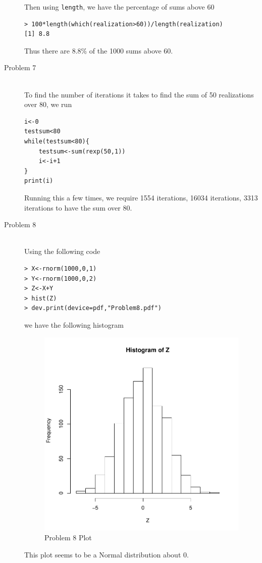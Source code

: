 \documentclass[10pt]{article}
\begin{document}
\begin{description}
Then using \verb+length+, we have the percentage of sums above 60
\begin{lstlisting}[frame=trBL]
> 100*length(which(realization>60))/length(realization)
[1] 8.8
\end{lstlisting}
Thus there are 8.8\% of the 1000 sums above 60.
\item[Problem 7]\hfill\\
To find the number of iterations it takes to find the sum of 50 realizations over 80, we run
\begin{lstlisting}[frame=trBL]
i<-0
testsum<80
while(testsum<80){
	testsum<-sum(rexp(50,1))
	i<-i+1
}
print(i)
\end{lstlisting}
Running this a few times, we require 1554 iterations, 16034 iterations, 3313 iterations to have the sum over 80.
\item[Problem 8]\hfill\\
Using the following code
\begin{lstlisting}[frame=trBL]
> X<-rnorm(1000,0,1)
> Y<-rnorm(1000,0,2)
> Z<-X+Y
> hist(Z)
> dev.print(device=pdf,"Problem8.pdf")
\end{lstlisting}
we have the following histogram
\begin{figure}
\centering
\includegraphics[width=15cm]{../Problem8.pdf}\caption{Problem 8 Plot}
\end{figure}
This plot seems to be a Normal distribution about 0.


\end{description}
\end{document}
